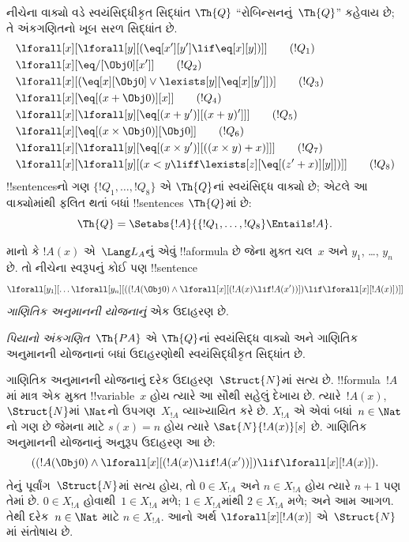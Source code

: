 \documentclass[../../../include/open-logic-section]{subfiles}
\begin{document}
\begin{defn}
નીચેના વાક્યો વડે સ્વયંસિદ્ધીકૃત સિદ્ધાંત
$\Th{Q}$ ``રોબિન્સનનું~$\Th{Q}$'' કહેવાય છે;
તે અંકગણિતનો ખૂબ સરળ સિદ્ધાંત છે.
\begin{align*}
& \lforall[x][\lforall[y][(\eq[x'][y'] \lif \eq[x][y])]] \tag{$!Q_1$}\\
& \lforall[x][\eq/[\Obj 0][x']] \tag{$!Q_2$}\\
& \lforall[x][(\eq[x][\Obj 0] \lor \lexists[y][\eq[x][y']])] \tag{$!Q_3$}\\
& \lforall[x][\eq[(x + \Obj 0)][x]] \tag{$!Q_4$}\\
& \lforall[x][\lforall[y][\eq[(x + y')][(x + y)']]] \tag{$!Q_5$}\\
& \lforall[x][\eq[(x \times \Obj 0)][\Obj 0]] \tag{$!Q_6$}\\
& \lforall[x][\lforall[y][\eq[(x \times y')][((x \times y) + x)]]] \tag{$!Q_7$}\\
& \lforall[x][\lforall[y][(x < y \liff \lexists[z][\eq[(z' + x)][y]])]] \tag{$!Q_8$}
\end{align*}
!!{sentence}sનો ગણ $\{!Q_1, \dots, !Q_8\}$ એ
$\Th{Q}$નાં સ્વયંસિદ્ધ વાક્યો છે; એટલે આ
વાક્યોમાંથી ફલિત થતાં બધાં !!{sentence}s
$\Th{Q}$માં છે:
\[
\Th{Q} = \Setabs{!A}{\{!Q_1, \dots, !Q_8\} \Entails !A}.
\]
\end{defn}

\begin{defn}
માનો કે $!A(x)$ એ~$\Lang L_A$નું એવું
!!a{formula} છે જેના મુક્ત ચલ~$x$ અને
$y_1$, \dots, $y_n$ છે. તો નીચેના સ્વરૂપનું
કોઈ પણ !!{sentence}
\[
\lforall[y_1][\dots\lforall[y_n][((!A(\Obj 0) \land \lforall[x][(!A(x)
\lif !A(x'))]) \lif \lforall[x][!A(x)])]]
\]
\emph{ગાણિતિક અનુમાનની યોજનાનું} એક ઉદાહરણ છે.

\emph{પિયાનો અંકગણિત}~$\Th{PA}$ એ
$\Th{Q}$નાં સ્વયંસિદ્ધ વાક્યો અને ગાણિતિક અનુમાનની
યોજનાનાં બધાં ઉદાહરણોથી સ્વયંસિદ્ધીકૃત
સિદ્ધાંત છે.
\end{defn}

\begin{explain}
ગાણિતિક અનુમાનની યોજનાનું દરેક ઉદાહરણ~$\Struct{N}$માં
સત્ય છે. !!{formula}~$!A$માં માત્ર એક મુક્ત
!!{variable}~$x$ હોય ત્યારે આ સૌથી સહેલું
દેખાય છે. ત્યારે~$!A(x)$, $\Struct{N}$માં
$\Nat$નો ઉપગણ~$X_{!A}$ વ્યાખ્યાયિત કરે છે.
$X_{!A}$ એ એવાં બધાં~$n \in \Nat$નો ગણ છે
જેમના માટે $s(x)=n$ હોય ત્યારે
$\Sat{N}{!A(x)}[s]$ છે. ગાણિતિક અનુમાનની યોજનાનું
અનુરૂપ ઉદાહરણ આ છે:
\[
((!A(\Obj 0) \land \lforall[x][(!A(x) \lif !A(x'))]) \lif 
  \lforall[x][!A(x)]).
\]
તેનું પૂર્વાંગ~$\Struct{N}$માં સત્ય હોય,
તો $0 \in X_{!A}$ અને $n \in X_{!A}$ હોય
ત્યારે $n+1$ પણ તેમાં છે. $0 \in X_{!A}$
હોવાથી~$1 \in X_{!A}$ મળે; $1 \in X_{!A}$માંથી
$2 \in X_{!A}$ મળે; અને આમ આગળ.
તેથી દરેક~$n \in \Nat$ માટે
$n \in X_{!A}$. આનો અર્થ
$\lforall[x][!A(x)]$ એ~$\Struct{N}$માં
સંતોષાય છે.
\end{explain}
\end{document}
